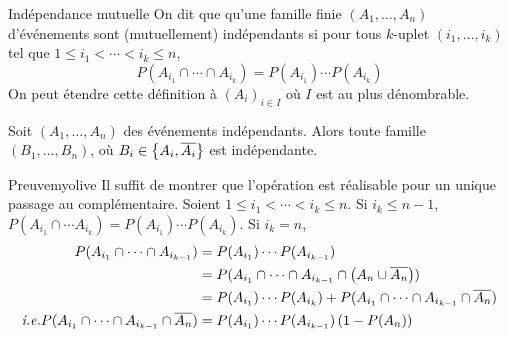     \begin{defi}{Indépendance mutuelle}{}
        On dit que qu’une famille finie $(A_1, \ldots, A_n)$ d’événements sont (mutuellement) indépendants si pour tous $k$-uplet $(i_1,\ldots,i_k)$ tel que $1 \leq i_1 < \cdots < i_k \leq n$, 
            \[ P(A_{i_1} \cap \cdots \cap A_{i_k}) = P(A_{i_1}) \cdots P(A_{i_k}) \]  
        On peut étendre cette définition à $(A_i)_{i \in I}$ où $I$ est au plus dénombrable.
    \end{defi}

    \begin{prop}{}{}
        Soit $(A_1, \ldots, A_n)$ des événements indépendants. Alors toute famille $(B_1, \ldots, B_n)$, où $B_i \in \left\{A_i, \overline{A_i}\right\}$ est indépendante.
    \end{prop}

    \begin{demo}{Preuve}{myolive}   
        Il suffit de montrer que l’opération est réalisable pour un unique passage au complémentaire. Soient $1 \leq i_1 < \cdots < i_k \leq n$. Si $i_k \leq n-1$, $P(A_{i_1} \cap \cdots A_{i_k}) = P(A_{i_1}) \cdots P(A_{i_k})$. Si $i_k = n$, 
        \begin{align*}
            P(A_{i_1} \cap \cdots \cap A_{i_{k-1}}) &= P(A_{i_1}) \cdots P(A_{i_{k-1}}) \\
            &= P(A_{i_1} \cap \cdots \cap A_{i_{k-1}} \cap \left(A_n \cup \overline{A_n}\right)) \\
            &= P(A_{i_1}) \cdots P(A_{i_k}) + P(A_{i_1} \cap \cdots \cap A_{i_{k-1}} \cap \overline{A_n}) \\
            \textit{i.e.} P(A_{i_1} \cap \cdots \cap A_{i_{k-1}} \cap \overline{A_n}) &= P(A_{i_1}) \cdots P(A_{i_{k-1}}) \left(1 - P(A_n)\right)
        \end{align*}
    \end{demo}

